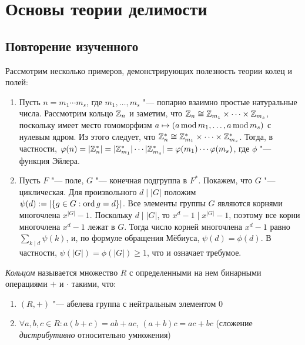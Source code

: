 \section{Основы теории делимости}

\subsection{Повторение изученного}

\begin{example}
	Рассмотрим несколько примеров, демонстрирующих полезность теории колец и полей:
	\begin{enumerate}
		\item Пусть $n = m_1 \dotsm m_s$, где $m_1, \dotsc, m_s$ "--- попарно взаимно простые натуральные числа. Рассмотрим кольцо $\mathbb{Z}_n$ и заметим, что $\mathbb{Z}_n \cong \mathbb{Z}_{m_1} \times \dotsb \times \mathbb{Z}_{m_s}$, поскольку имеет место гомоморфизм $a \mapsto (a \operatorname{mod} m_1, \dotsc, a \operatorname{mod} m_s)$ с нулевым ядром. Из этого следует, что $\mathbb{Z}_n^* \cong \mathbb{Z}_{m_1}^* \times \dotsb \times \mathbb{Z}_{m_s}^*$. Тогда, в частности, $\phi(n) =  |\Z_n^*| \hm= |\Z_{m_1}^*|\dotsm|\Z_{m_s}^*| \hm= \phi(m_1)\dotsm\phi(m_s)$, где $\phi$ "--- функция Эйлера.
		\item Пусть $F$ "--- поле, $G$ "--- конечная подгруппа в $F^*$. Покажем, что $G$ "--- циклическая. Для произвольного $d\mid |G|$ положим $\psi(d) := |\{g \in G: \operatorname{ord}{g} = d\}|$. Все элементы группы $G$ являются корнями многочлена $x^{|G|} - 1$. Поскольку $d\mid |G|$, то $x^{d} - 1 \mid x^{|G|} - 1$, поэтому все корни многочлена $x^d - 1$ лежат в $G$. Тогда число корней многочлена $x^d - 1$ равно $\sum_{k \mid d} \psi(k)$, и, по формуле обращения Мёбиуса, $\psi(d) = \phi(d)$. В частности, $\psi(|G|) = \phi(|G|) \ge 1$, что и означает требумое.
	\end{enumerate}
\end{example}

\begin{definition}
	\textit{Кольцом} называется множество $R$ с определенными на нем бинарными операциями $+$ и $\cdot$ такими, что:
	\begin{enumerate}
		\item $(R, +)$ "--- абелева группа с нейтральным элементом 0
		\item $\forall a, b, c \in R: a(b + c) = ab + ac$, $(a + b)c = ac + bc$ (сложение \textit{дистрибутивно} относительно умножения)
	\end{enumerate}
\end{definition}

